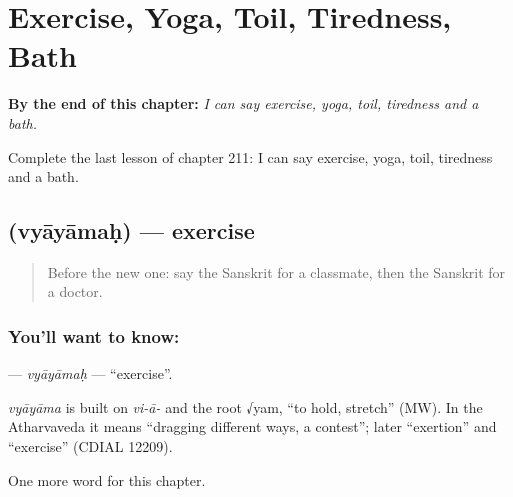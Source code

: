 
\chapter{Exercise, Yoga, Toil, Tiredness, Bath}
\label{ch:sa-exercise-yoga-toil-tiredness-bath}

\begin{chapteropening}
\textbf{By the end of this chapter:} \emph{I can say exercise, yoga, toil, tiredness and a bath.}

Complete the last lesson of chapter 211: I can say exercise, yoga, toil, tiredness and a bath.
\end{chapteropening}

\section[\texorpdfstring{\sk{व्यायामः} (vyāyāmaḥ)}{व्यायामः (vyāyāmaḥ)}]{ (vyāyāmaḥ) — exercise}

\label{lesson:SA-C211-vyayamah}



\begin{quote}
Before the new one: say the Sanskrit for a classmate, then the Sanskrit for a doctor.
\end{quote}

\subsection*{You'll want to know: }
\textbf{} — \emph{vyāyāmaḥ} — \textquotedblleft{}exercise\textquotedblright{}.

\begin{cousinweb}
\emph{vyāyāma} is built on \emph{vi-ā-} and the root √yam, \textquotedblleft{}to hold, stretch\textquotedblright{} (MW). In the Atharvaveda it means \textquotedblleft{}dragging different ways, a contest\textquotedblright{}; later \textquotedblleft{}exertion\textquotedblright{} and \textquotedblleft{}exercise\textquotedblright{} (CDIAL 12209).
\end{cousinweb}

\begin{grammarlens}[title={What you've built}]
One more word for this chapter.
\end{grammarlens}

